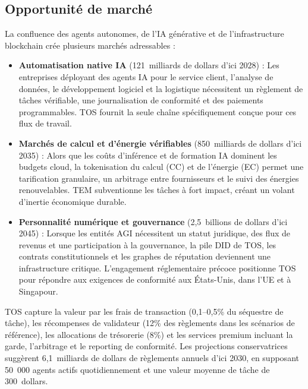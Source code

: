 \documentclass[11pt]{article}
\begin{document}
\subsection{Opportunité de marché}
La confluence des agents autonomes, de l'IA générative et de l'infrastructure blockchain crée plusieurs marchés adressables :
\begin{itemize}[noitemsep]
  \item \textbf{Automatisation native IA} (121~milliards de dollars d'ici 2028) : Les entreprises déployant des agents IA pour le service client, l'analyse de données, le développement logiciel et la logistique nécessitent un règlement de tâches vérifiable, une journalisation de conformité et des paiements programmables. TOS fournit la seule chaîne spécifiquement conçue pour ces flux de travail.
  \item \textbf{Marchés de calcul et d'énergie vérifiables} (850~milliards de dollars d'ici 2035) : Alors que les coûts d'inférence et de formation IA dominent les budgets cloud, la tokenisation du calcul (CC) et de l'énergie (EC) permet une tarification granulaire, un arbitrage entre fournisseurs et le suivi des énergies renouvelables. TEM subventionne les tâches à fort impact, créant un volant d'inertie économique durable.
  \item \textbf{Personnalité numérique et gouvernance} (2,5~billions de dollars d'ici 2045) : Lorsque les entités AGI nécessitent un statut juridique, des flux de revenus et une participation à la gouvernance, la pile DID de TOS, les contrats constitutionnels et les graphes de réputation deviennent une infrastructure critique. L'engagement réglementaire précoce positionne TOS pour répondre aux exigences de conformité aux États-Unis, dans l'UE et à Singapour.
\end{itemize}

TOS capture la valeur par les frais de transaction (0,1--0,5\% du séquestre de tâche), les récompenses de validateur (12\% des règlements dans les scénarios de référence), les allocations de trésorerie (8\%) et les services premium incluant la garde, l'arbitrage et le reporting de conformité. Les projections conservatrices suggèrent 6,1~milliards de dollars de règlements annuels d'ici 2030, en supposant 50~000 agents actifs quotidiennement et une valeur moyenne de tâche de 300~dollars.
\end{document}

